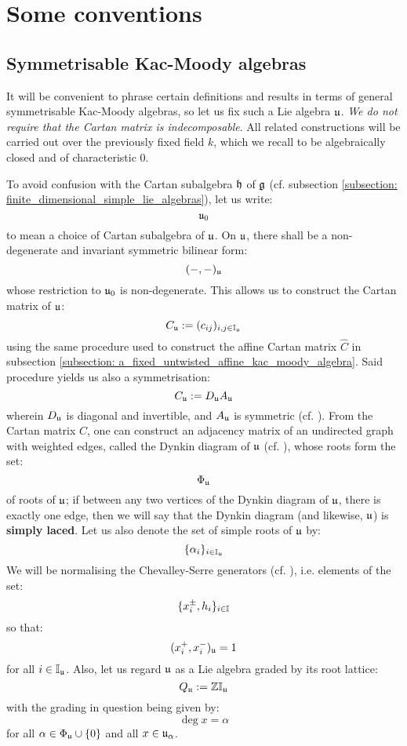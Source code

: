 \section{Some conventions}
    \subsection{Symmetrisable Kac-Moody algebras} \label{subection: a_fixed_symmetrisable_kac_moody_algebra}
        It will be convenient to phrase certain definitions and results in terms of general symmetrisable Kac-Moody algebras, so let us fix such a Lie algebra $\mathfrak{u}$. \textit{We do not require that the Cartan matrix is indecomposable}. All related constructions will be carried out over the previously fixed field $k$, which we recall to be algebraically closed and of characteristic $0$. 

        To avoid confusion with the Cartan subalgebra $\mathfrak{h}$ of $\mathfrak{g}$ (cf. subsection \ref{subsection: finite_dimensional_simple_lie_algebras}), let us write:
            $$\mathfrak{u}_0$$
        to mean a choice of Cartan subalgebra of $\mathfrak{u}$. On $\mathfrak{u}$, there shall be a non-degenerate and invariant symmetric bilinear form:
            $$(-, -)_{\mathfrak{u}}$$
        whose restriction to $\mathfrak{u}_0$ is non-degenerate. This allows us to construct the Cartan matrix of $\mathfrak{u}$:
            $$C_{\mathfrak{u}} := (c_{ij})_{i, j \in \mathbb{I}_{\mathfrak{u}}}$$
        using the same procedure used to construct the affine Cartan matrix $\hat{C}$ in subsection \ref{subsection: a_fixed_untwisted_affine_kac_moody_algebra}. Said procedure yields us also a symmetrisation:
            $$C_{\mathfrak{u}} := D_{\mathfrak{u}} A_{\mathfrak{u}}$$
        wherein $D_{\mathfrak{u}}$ is diagonal and invertible, and $A_{\mathfrak{u}}$ is symmetric (cf. \cite[Chapter 2]{kac_infinite_dimensional_lie_algebras}). From the Cartan matrix $C$, one can construct an adjacency matrix of an undirected graph with weighted edges, called the Dynkin diagram of $\mathfrak{u}$ (cf. \cite[Section 4.7]{kac_infinite_dimensional_lie_algebras}), whose roots form the set:
            $$\Phi_{\mathfrak{u}}$$
        of roots of $\mathfrak{u}$; if between any two vertices of the Dynkin diagram of $\mathfrak{u}$, there is exactly one edge, then we will say that the Dynkin diagram (and likewise, $\mathfrak{u}$) is \textbf{simply laced}. Let us also denote the set of simple roots of $\mathfrak{u}$ by:
            $$\{\alpha_i\}_{i \in \mathbb{I}_{\mathfrak{u}}}$$
        We will be normalising the Chevalley-Serre generators (cf. \cite[Theorem 1.4]{kac_infinite_dimensional_lie_algebras}), i.e. elements of the set:
            $$\{x_i^{\pm}, h_i\}_{i \in \mathbb{I}}$$
        so that:
            $$(x_i^+, x_i^-)_{\mathfrak{u}} = 1$$
        for all $i \in \mathbb{I}_{\mathfrak{u}}$. Also, let us regard $\mathfrak{u}$ as a Lie algebra graded by its root lattice:
            $$Q_{\mathfrak{u}} := \mathbb{Z}\mathbb{I}_{\mathfrak{u}}$$
        with the grading in question being given by:
            $$\deg x = \alpha$$
        for all $\alpha \in \Phi_{\mathfrak{u}} \cup \{0\}$ and all $x \in \mathfrak{u}_{\alpha}$.
        
